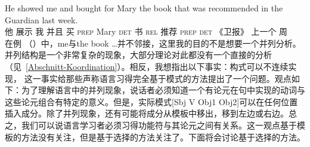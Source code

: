 \ea
\gll He showed me and bought for Mary the book that was recommended in the Guardian last week.\\
    他 展示 我 并且 买 \textsc{prep} Mary \textsc{det} 书 \textsc{rel} \passivepst{} 推荐 \textsc{prep} \textsc{det} 《卫报》 上一个 周\\
\z
在例 （）中，me与the book \ldots{}并不邻接，这里我的目的不是想要一个并列分析。并列结构是一个非常复杂的现象，大部分理论对此都没有一个直接的分析（见~\ref{Abschnitt-Koordination}）。相反，我想指出以下事实：构式可以不连续实现， 这一事实给那些声称语言习得完全基于模式的方法提出了一个问题。观点如下：为了理解语言中的并列现象，说话者必须知道一个有论元在句中实现的动词与这些论元组合有特定的意义。但是，实际模式[Sbj V Obj1 Obj2]可以在任何位置插入成分。除了并列现象，还有可能将成分从模板中移出，移到左边或右边。总之，我们可以说语言学习者必须习得功能符与其论元之间有关系。这一观点基于模板的方法没有关注，但是基于选择的方法关注了。下面将会讨论基于选择的方法。

